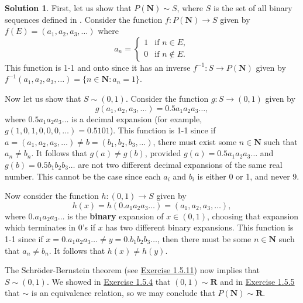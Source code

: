 \documentclass[12pt]{article}
\theoremstyle{definition}
\theoremstyle{exercise}
\theoremstyle{solution}
\newtheorem*{solution}{Solution}
\newcommand{\N}{\mathbf{N}}
\newcommand{\R}{\mathbf{R}}
\begin{document}
\begin{solution}
    First, let us show that \( P(\N) \sim S \), where \( S \) is the set of all binary sequences defined in . Consider the function \( f : P(\N) \to S \) given by \( f(E) = (a_1, a_2, a_3, \ldots) \) where
    \[
        a_n = \begin{cases}
            1 & \text{if } n \in E, \\
            0 & \text{if } n \not\in E.
        \end{cases}
    \]
    This function is 1-1 and onto since it has an inverse \( f^{-1} : S \to P(\N) \) given by \( f^{-1}(a_1, a_2, a_3, \ldots) = \{ n \in \N : a_n = 1 \} \).

    Now let us show that \( S \sim (0, 1) \). Consider the function \( g : S \to (0, 1) \) given by
    \[
        g(a_1, a_2, a_3, \ldots) = 0.5 a_1 a_2 a_3 \ldots,
    \]
    where \( 0.5 a_1 a_2 a_3 \ldots \) is a decimal expansion (for example, \( g(1, 0, 1, 0, 0, 0, \ldots) = 0.5101 \)). This function is 1-1 since if \( a = (a_1, a_2, a_3, \ldots) \neq b = (b_1, b_2, b_3, \ldots) \), there must exist some \( n \in \N \) such that \( a_n \neq b_n \). It follows that \( g(a) \neq g(b) \), provided \( g(a) = 0.5 a_1 a_2 a_3 \ldots  \) and \( g(b) = 0.5 b_1 b_2 b_3 \ldots \) are not two different decimal expansions of the same real number. This cannot be the case since each \( a_i \) and \( b_i \) is either 0 or 1, and never 9.

    Now consider the function \( h : (0, 1) \to S \) given by
    \[
        h(x) = h(0.a_1 a_2 a_3 \ldots) = (a_1, a_2, a_3, \ldots),
    \]
    where \( 0.a_1 a_2 a_3 \ldots \) is the \textbf{binary} expansion of \( x \in (0, 1) \), choosing that expansion which terminates in 0's if \( x \) has two different binary expansions. This function is 1-1 since if \( x = 0.a_1 a_2 a_3 \ldots \neq y = 0.b_1 b_2 b_3 \ldots \), then there must be some \( n \in \N \) such that \( a_n \neq b_n \). It follows that \( h(x) \neq h(y) \).

    The Schröder-Bernstein theorem (see \href{https://lew98.github.io/Mathematics/UA_Section_1_5_Exercises.pdf}{Exercise 1.5.11}) now implies that \( S \sim (0, 1) \). We showed in \href{https://lew98.github.io/Mathematics/UA_Section_1_5_Exercises.pdf}{Exercise 1.5.4} that \( (0, 1) \sim \R \) and in \href{https://lew98.github.io/Mathematics/UA_Section_1_5_Exercises.pdf}{Exercise 1.5.5} that \( \sim \) is an equivalence relation, so we may conclude that \( P(\N) \sim \R \).
\end{solution}
\end{document}
